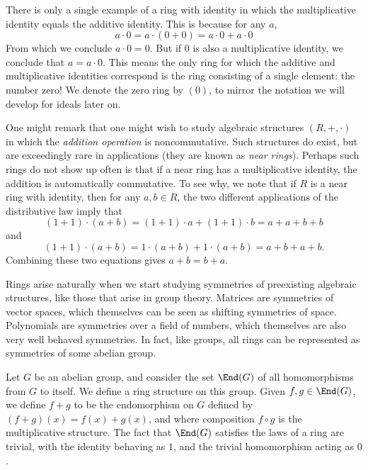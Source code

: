 \begin{remark}
    There is only a single example of a ring with identity in which the multiplicative identity equals the additive identity. This is because for any $a$,
    \[ a \cdot 0 = a \cdot (0 + 0) = a \cdot 0 + a \cdot 0 \]
    From which we conclude $a \cdot 0 = 0$. But if $0$ is also a multiplicative identity, we conclude that $a = a \cdot 0$. This means the only ring for which the additive and multiplicative identities correspond is the ring consisting of a single element: the number zero! We denote the zero ring by $(0)$, to mirror the notation we will develop for ideals later on.
\end{remark}

\begin{remark}
    One might remark that one might wish to study algebraic structures $(R,+,\cdot)$ in which the \emph{addition operation} is noncommutative. Such structures do exist, but are exceedingly rare in applications (they are known as \emph{near rings}). Perhaps such rings do not show up often is that if a near ring has a multiplicative identity, the addition is automatically commutative. To see why, we note that if $R$ is a near ring with identity, then for any $a,b \in R$, the two different applications of the distributive law imply that
    \[ (1 + 1) \cdot (a + b) = (1 + 1) \cdot a + (1 + 1) \cdot b = a + a + b + b \]
    and
    \[ (1 + 1) \cdot (a + b) = 1 \cdot (a + b) + 1 \cdot (a + b) = a + b + a + b. \]
    Combining these two equations gives $a + b = b + a$.
\end{remark}

Rings arise naturally when we start studying symmetries of preexisting algebraic structures, like those that arise in group theory. Matrices are symmetries of vector spaces, which themselves can be seen as shifting symmetries of space. Polynomials are symmetries over a field of numbers, which themselves are also very well behaved symmetries. In fact, like groups, all rings can be represented as symmetries of some abelian group.

\begin{example}
    Let $G$ be an abelian group, and consider the set $\End(G)$ of all homomorphisms from $G$ to itself. We define a ring structure on this group. Given $f,g \in \End(G)$, we define $f+g$ to be the endomorphism on $G$ defined by $(f + g)(x) = f(x) + g(x)$, and where composition $f \circ g$ is the multiplicative structure. The fact that $\End(G)$ satisfies the laws of a ring are trivial, with the identity behaving as $1$, and the trivial homomorphism acting as $0$.
\end{example}

